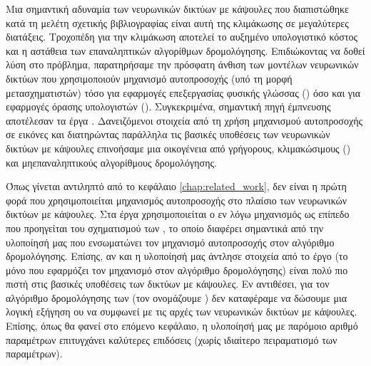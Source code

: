Μια σημαντική αδυναμία των νευρωνικών δικτύων με κάψουλες που διαπιστώθηκε κατά τη μελέτη σχετικής βιβλιογραφίας είναι αυτή της κλιμάκωσης σε μεγαλύτερες διατάξεις. Τροχοπέδη για την κλιμάκωση αποτελεί το αυξημένο υπολογιστικό κόστος και η αστάθεια των επαναληπτικών αλγορίθμων δρομολόγησης. Επιδιώκοντας να δοθεί λύση στο πρόβλημα, παρατηρήσαμε την πρόσφατη άνθιση των μοντέλων νευρωνικών δικτύων που χρησιμοποιούν μηχανισμό αυτο\textendash προσοχής (υπό τη μορφή μετασχηματιστών) τόσο για εφαρμογές επεξεργασίας φυσικής γλώσσας () όσο και για εφαρμογές όρασης υπολογιστών (). Συγκεκριμένα,  σημαντική πηγή έμπνευσης αποτέλεσαν τα έργα \cite{dosovitskiy2020image_is_worth_16, carion2020end}. Δανειζόμενοι στοιχεία από τη χρήση μηχανισμού αυτο\textendash προσοχής σε εικόνες και διατηρώντας παράλληλα τις βασικές υποθέσεις των νευρωνικών δικτύων με κάψουλες επινοήσαμε μια οικογένεια από γρήγορους, κλιμακώσιμους () και μη\textendash επαναληπτικούς αλγορίθμους δρομολόγησης.\par

Όπως γίνεται αντιληπτό από το κεφάλαιο \ref{chap:related_work}, δεν είναι η πρώτη φορά που χρησιμοποιείται μηχανισμός αυτο\textendash προσοχής στο πλαίσιο των νευρωνικών δικτύων με κάψουλες. Στα έργα \cite{hoogi2019self, huang2020capsnet} χρησιμοποιείται ο εν λόγω μηχανισμός ως επίπεδο που προηγείται του σχηματισμού των , το οποίο διαφέρει σημαντικά από την υλοποίησή μας που ενσωματώνει τον μηχανισμό αυτο\textendash προσοχής στον αλγόριθμο δρομολόγησης. Επίσης, αν και η υλοποίησή μας άντλησε στοιχεία από το έργο \cite{mazzia2021efficient} (το μόνο που εφαρμόζει τον μηχανισμό στον αλγόριθμο δρομολόγησης) είναι πολύ πιο πιστή στις βασικές υποθέσεις των δικτύων με κάψουλες. Εν αντιθέσει, για τον αλγόριθμο δρομολόγησης των  (τον ονομάζουμε ) δεν καταφέραμε να δώσουμε μια λογική εξήγηση ου να συμφωνεί με τις αρχές των νευρωνικών δικτύων με κάψουλες. Επίσης, όπως θα φανεί στο επόμενο κεφάλαιο, η υλοποίησή μας με παρόμοιο αριθμό παραμέτρων επιτυγχάνει καλύτερες επιδόσεις (χωρίς ιδιαίτερο πειραματισμό των παραμέτρων).\par

